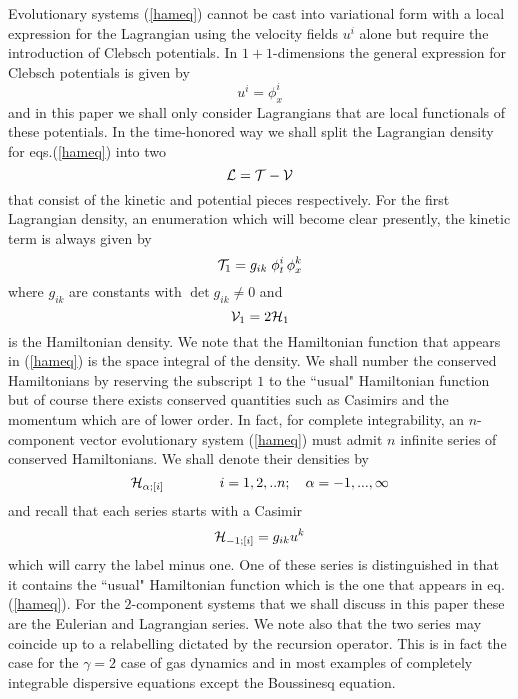 \documentclass[a4paper,12pt]{article}
\begin{document}
Evolutionary systems (\ref{hameq}) cannot be cast into variational
form with a local expression for the Lagrangian using the velocity
fields $u^i$ alone but require the introduction of Clebsch
potentials. In $1+1$-dimensions the general expression for Clebsch
potentials is given by
\begin{equation}
u^i =  \phi^i_x
\label{clebsch}
\end{equation}
and in this paper we shall only consider Lagrangians that are
local functionals of these potentials. In the time-honored way we
shall split the Lagrangian density for eqs.(\ref{hameq}) into two
\begin{equation}
{\cal L} =  {\cal T} - {\cal V} \label{lagtot}
\end{equation}
that consist of the kinetic and potential pieces respectively. For
the first Lagrangian density, an enumeration which will become
clear presently, the kinetic term is always given by
\begin{equation}
{\cal T}_{1} = g_{ik} \;  \phi^i_t \, \phi^k_x \label{kinetic}
\end{equation}
where $g_{ik}$ are constants with $\det g_{ik} \ne 0$ and
\begin{equation}
{\cal V}_{1} = 2 {\cal H}_1 \label{potential}
\end{equation}
is the Hamiltonian density. We note that the Hamiltonian function
that appears in (\ref{hameq}) is the space integral of the
density. We shall number the conserved Hamiltonians by reserving
the subscript $1$ to the ``usual" Hamiltonian function but of
course there exists conserved quantities such as Casimirs and the
momentum which are of lower order. In fact, for complete
integrability, an $n$-component vector evolutionary system
(\ref{hameq}) must admit $n$ infinite series of conserved
Hamiltonians. We shall denote their densities by
\begin{equation}
{\cal H}_{\alpha ; [i]} \qquad \qquad i=1,2,..n; \quad
\alpha=-1,...,\infty  \label{series}
\end{equation}
and recall that each series starts with a Casimir
\begin{equation}
 {\cal H}_{-1 ; [i]} = g_{ik} u^k   \label{casimir}
\end{equation}
which will carry the label minus one. One of these series is
distinguished in that it contains the ``usual" Hamiltonian
function which is the one that appears in eq.(\ref{hameq}). For
the $2$-component systems that we shall discuss in this paper
these are the Eulerian and Lagrangian series. We note also that
the two series may coincide up to a relabelling dictated by the
recursion operator. This is in fact the case for the $\gamma=2$
case of gas dynamics and in most examples of completely integrable
dispersive equations except the Boussinesq equation.
\end{document}
